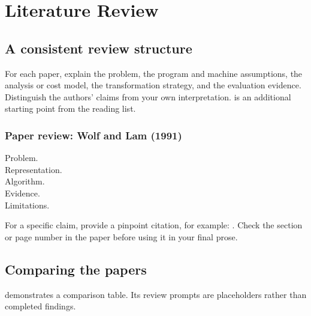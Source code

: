 \chapter{Literature Review}
\label{chap:literature}

\section{A consistent review structure}
For each paper, explain the problem, the program and machine assumptions, the
analysis or cost model, the transformation strategy, and the evaluation evidence.
Distinguish the authors' claims from your own interpretation.
\citet{carrMckinleyTseng1994} is an additional starting point from the reading list.

\subsection{Paper review: Wolf and Lam (1991)}
\begin{description}
  \item[Problem.] 
  \item[Representation.] 
  \item[Algorithm.] 
  \item[Evidence.] 
  \item[Limitations.] 
\end{description}
For a specific claim, provide a pinpoint citation, for example:
\citep[Section~2]{wolfLam1991locality}. Check the section or page number in the
paper before using it in your final prose.

\section{Comparing the papers}
 demonstrates a comparison table. Its review
prompts are placeholders rather than completed findings.

